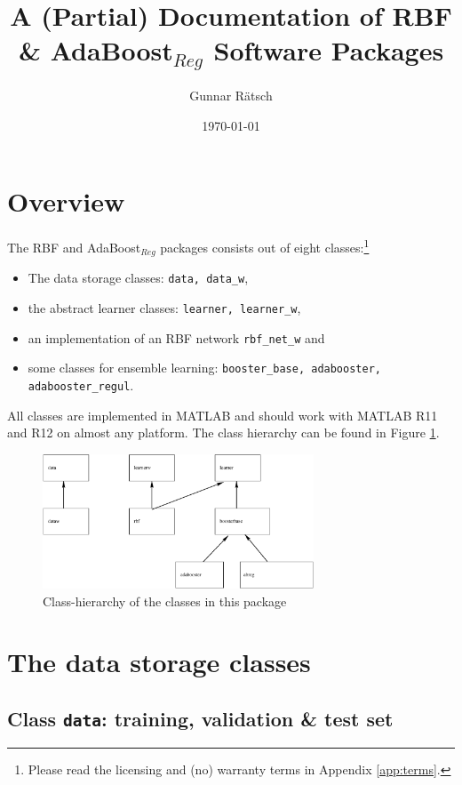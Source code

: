 \documentclass{article}
\title{A (Partial) Documentation of RBF \& AdaBoost$_{Reg}$ Software Packages}
\author{Gunnar R\"atsch}
\date{\today}
\begin{document}
\maketitle

\section{Overview}
The RBF and AdaBoost$_{Reg}$ packages consists out of eight
classes:\footnote{Please read the licensing and (no) warranty terms in
  Appendix \ref{app:terms}.}
\begin{itemize}
\item The data storage classes: {\tt data, data\_w},
\item the abstract learner classes: {\tt learner, learner\_w},
\item an implementation of an RBF network {\tt rbf\_net\_w} and
\item some classes for ensemble learning: {\tt booster\_base, adabooster, adabooster\_regul}.
\end{itemize}
All classes are implemented in MATLAB and should work with MATLAB R11 and R12
on almost any platform. The class hierarchy can be found in Figure
\ref{fig:hier}.
\begin{figure}[h]
\begin{center}
\includegraphics[width=\textwidth,height=4cm]{hier}
\end{center}
\caption{\label{fig:hier} Class-hierarchy of the classes in this package}
\end{figure}

\section{The data storage classes}

\subsection{Class {\tt data}: training, validation \& test set}
\end{document}
